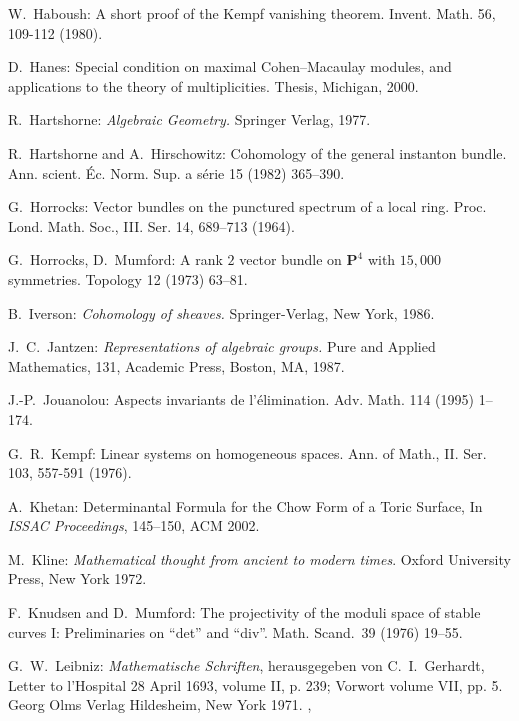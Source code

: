 \documentclass{jams-l}
\theoremstyle{definition}
\theoremstyle{remark}
\begin{document}
\begin{thebibliography}{}
W.~Haboush:
A short proof of the Kempf vanishing theorem. 
Invent. Math. 56, 109-112 (1980).

D.~Hanes: Special condition on maximal Cohen--Macaulay modules, and 
applications to the theory of multiplicities. Thesis, Michigan, 2000.

R.~Hartshorne: {\it Algebraic Geometry.} Springer Verlag, 1977.

R.~Hartshorne and A.~Hirschowitz: Cohomology of the general instanton bundle. 
Ann. scient. \'Ec. Norm. Sup. a s\'erie 15 (1982) 365--390.

G.~Horrocks:
Vector bundles on the punctured spectrum of a local ring.
Proc. Lond. Math. Soc., III. Ser. 14, 689--713 (1964). 

G.~Horrocks, D.~Mumford: A rank $2$ vector bundle on ${\mathbf P}^4$ with 
$15,000$
symmetries. Topology 12 (1973) 63--81.

B.~Iverson: {\it Cohomology of sheaves.\/}
Springer-Verlag, New York, 1986.

J.~C.~Jantzen:
{\it Representations of algebraic groups.\/}
Pure and Applied Mathematics, 131, 
Academic Press, Boston, MA, 1987. 

J.-P.~Jouanolou: Aspects invariants de l'\'elimination.
Adv. Math. 114 (1995) 1--174.

G.~R.~Kempf:
Linear systems on homogeneous spaces.
Ann. of Math., II. Ser. 103, 557-591 (1976).

A.~Khetan:
Determinantal Formula for the Chow Form of a Toric Surface, 
In {\it ISSAC Proceedings}, 145--150, ACM 2002.

M.~Kline: {\it Mathematical thought from ancient to modern times}.
Oxford University Press, New York 1972.

F.~Knudsen and D.~Mumford: The projectivity of the moduli
space of stable curves I: Preliminaries on ``det'' and ``div''.
Math. Scand.~39 (1976) 19--55.

G.~W.~Leibniz: {\it Mathematische Schriften}, herausgegeben von C.~I.~Gerhardt,
Letter to l'Hospital 28 April 1693, volume II, p. 239; 
Vorwort volume VII, pp. 5.
Georg Olms Verlag Hildesheim, New York 1971.
, 


\end{thebibliography}
\end{document}
